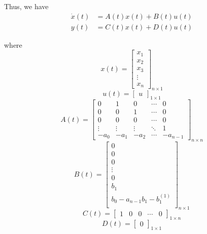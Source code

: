 Thus, we have
\[
    \begin{aligned}
        \dot{x}(t) & = A(t) x(t) + B(t) u(t) \\
        y(t)       & = C(t) x(t) + D(t) u(t)
    \end{aligned}
\]

where
\[
    x(t) =
    \begin{bmatrix}
        x_1    \\
        x_2    \\
        x_3    \\
        \vdots \\
        x_n
    \end{bmatrix}
    _{n \times 1}
\]
\[
    u(t) =
    \begin{bmatrix}
        u
    \end{bmatrix}
    _{1 \times 1}
\]
\[
    A(t) =
    \begin{bmatrix}
        0      & 1      & 0      & \cdots & 0        \\
        0      & 0      & 1      & \cdots & 0        \\
        0      & 0      & 0      & \cdots & 0        \\
        \vdots & \vdots & \vdots & \ddots & 1        \\
        -a_0   & -a_1   & -a_2   & \cdots & -a_{n-1}
    \end{bmatrix}
    _{n \times n}
\]
\[
    B(t) =
    \begin{bmatrix}
        0                            \\
        0                            \\
        0                            \\
        \vdots                       \\
        0                            \\
        b_1                          \\
        b_0 - a_{n-1}b_1 - b_1^{(1)} \\
    \end{bmatrix}
    _{n \times 1}
\]
\[
    C(t) =
    \begin{bmatrix}
        1 & 0 & 0 & \cdots & 0
    \end{bmatrix}
    _{1 \times n}
\]
\[
    D(t) =
    \begin{bmatrix}
        0
    \end{bmatrix}
    _{1 \times 1}
\]

